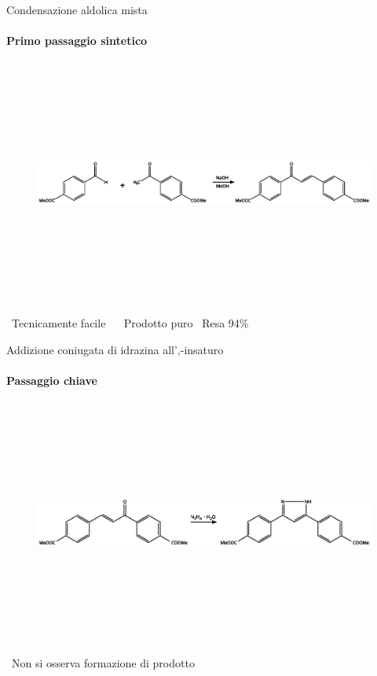 \documentclass[aspectration=169]{beamer}
\newcommand{\B}{\textcolor{maincolor}{\textbullet}}
\begin{document}
\begin{frame}{Condensazione aldolica mista}
	\framesubtitle{Primo passaggio sintetico}
	\centering
	\begin{figure}[h]
		\includegraphics[width=13cm,height=8cm,keepaspectratio]{illustration/aldolica.eps}
	\end{figure}
	\vspace{0.5cm}
	\B \ Tecnicamente facile \ \hspace{1cm} \B \ Prodotto puro \hspace{1cm} \B \ Resa 94\%
\end{frame}

\begin{frame}{Addizione coniugata di idrazina all'\textalpha,\textbeta -insaturo}
	\framesubtitle{Passaggio chiave}
	\centering
	\begin{figure}[h]
		\centering
		\includegraphics[width=13cm,height=8cm,keepaspectratio]{../Structures/pyrazole-form-alt.eps}
	\end{figure}
	\vspace{0.5cm}
	\B \ Non si osserva formazione di prodotto
\end{frame}
\end{document}
